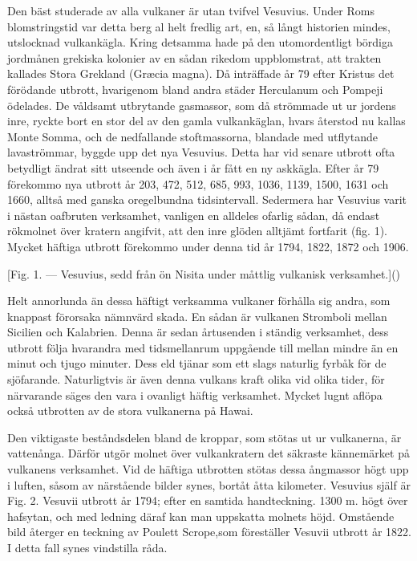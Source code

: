 \documentclass[a4paper, 12pt, oneside, swedish]{article}
\begin{document}
Den bäst studerade av alla vulkaner är utan tvifvel Vesuvius. Under Roms blomstringstid var detta berg al helt fredlig art, en, så långt historien mindes, utslocknad vulkankägla. Kring detsamma hade på den utomordentligt bördiga jordmånen grekiska kolonier av en sådan rikedom uppblomstrat, att trakten kallades Stora Grekland (Græcia magna). Då inträffade år 79 efter Kristus det förödande utbrott, hvarigenom bland andra städer Herculanum och Pompeji ödelades. De våldsamt utbrytande gasmassor, som då strömmade ut ur jordens inre, ryckte bort en stor del av den gamla vulkankäglan, hvars återstod nu kallas Monte Somma, och de nedfallande stoftmassorna, blandade med utflytande lavaströmmar, byggde upp det nya Vesuvius. Detta har vid senare utbrott ofta betydligt ändrat sitt utseende och även i år fått en ny askkägla. Efter år 79 förekommo nya utbrott år 203, 472, 512, 685, 993, 1036, 1139, 1500, 1631 och 1660, alltså med ganska oregelbundna tidsintervall. Sedermera har Vesuvius varit i nästan oafbruten verksamhet, vanligen en alldeles ofarlig sådan, då endast rökmolnet över kratern angifvit, att den inre glöden alltjämt fortfarit (fig. 1). Mycket häftiga utbrott förekommo under denna tid år 1794, 1822, 1872 och 1906.

[Fig. 1. --- Vesuvius, sedd från ön Nisita under måttlig vulkanisk verksamhet.]()

Helt annorlunda än dessa häftigt verksamma vulkaner förhålla sig andra, som knappast förorsaka nämnvärd skada. En sådan är vulkanen Stromboli mellan Sicilien och Kalabrien. Denna är sedan årtusenden i ständig verksamhet, dess utbrott följa hvarandra med tidsmellanrum uppgående till mellan mindre än en minut och tjugo minuter. Dess eld tjänar som ett slags naturlig fyrbåk för de sjöfarande. Naturligtvis är även denna vulkans kraft olika vid olika tider, för närvarande säges den vara i ovanligt häftig verksamhet. Mycket lugnt aflöpa också utbrotten av de stora vulkanerna på Hawai.

Den viktigaste beståndsdelen bland de kroppar, som stötas ut ur vulkanerna, är vattenånga. Därför utgör molnet över vulkankratern det säkraste kännemärket på vulkanens verksamhet. Vid de häftiga utbrotten stötas dessa ångmassor högt upp i luften, såsom av närstående bilder synes, bortåt åtta kilometer. Vesuvius själf är Fig. 2. Vesuvii utbrott år 1794; efter en samtida handteckning. 1300 m. högt över hafsytan, och med ledning däraf kan man uppskatta molnets höjd. Omstående bild återger en teckning av Poulett Scrope,som föreställer Vesuvii utbrott år 1822. I detta fall synes vindstilla råda.
\end{document}
